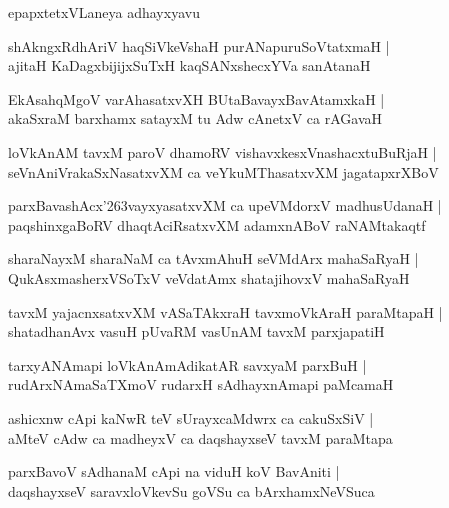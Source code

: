 \documentclass[twoside,12pt,openright]{book}
\def\S{\char'263}
\newcounter{shloka}[chapter]
\begin{document}
\begin{center}
epapxtetxVLaneya adhayxyavu
\end{center}

\begin{shloka}%
shAkngxRdhAriV haqSiVkeVshaH purANapuruSoVtatxmaH |\\
ajitaH KaDagxbijijxSuTxH kaqSANxshecxYVa sanAtanaH 
\end{shloka}

\begin{shloka}%
EkAsahqMgoV varAhasatxvXH BUtaBavayxBavAtamxkaH |\\
akaSxraM barxhamx satayxM tu Adw cAnetxV ca rAGavaH
\end{shloka}

\begin{shloka}%
loVkAnAM tavxM paroV dhamoRV vishavxkesxVnashacxtuBuRjaH |\\
seVnAniVrakaSxNasatxvXM ca veYkuMThasatxvXM jagatapxrXBoV 
\end{shloka}

\begin{shloka}%
parxBavashAcx\S vayxyasatxvXM ca upeVMdorxV madhusUdanaH |\\
paqshinxgaBoRV dhaqtAciRsatxvXM adamxnABoV raNAMtakaqtf
\end{shloka}

\begin{shloka}%
sharaNayxM sharaNaM ca tAvxmAhuH seVMdArx mahaSaRyaH |\\
QukAsxmasherxVSoTxV veVdatAmx shatajihovxV mahaSaRyaH 
\end{shloka}

\begin{shloka}%
tavxM yajacnxsatxvXM vASaTAkxraH tavxmoVkAraH paraMtapaH |\\
shatadhanAvx vasuH pUvaRM vasUnAM tavxM parxjapatiH 
\end{shloka}

\begin{shloka}%
tarxyANAmapi loVkAnAmAdikatAR savxyaM parxBuH |\\
rudArxNAmaSaTXmoV rudarxH sAdhayxnAmapi paMcamaH 
\end{shloka}

\begin{shloka}%
ashicxnw cApi kaNwR teV sUrayxcaMdwrx ca cakuSxSiV |\\
aMteV cAdw ca madheyxV ca daqshayxseV tavxM paraMtapa
\end{shloka}

\begin{shloka}%
parxBavoV sAdhanaM cApi na viduH koV BavAniti |\\
daqshayxseV saravxloVkevSu goVSu ca bArxhamxNeVSuca 
\end{shloka}
\end{document}
